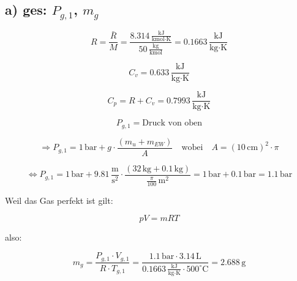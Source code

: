 \subsection*{a) ges: $P_{g,1}$, $m_g$}

\[
R = \frac{\bar{R}}{M} = \frac{8.314 \, \frac{\text{kJ}}{\text{kmol} \cdot \text{K}}}{50 \, \frac{\text{kg}}{\text{kmol}}} = 0.1663 \, \frac{\text{kJ}}{\text{kg} \cdot \text{K}}
\]

\[
C_v = 0.633 \, \frac{\text{kJ}}{\text{kg} \cdot \text{K}}
\]

\[
C_p = R + C_v = 0.7993 \, \frac{\text{kJ}}{\text{kg} \cdot \text{K}}
\]

\[
P_{g,1} = \text{Druck von oben}
\]

\[
\Rightarrow P_{g,1} = 1 \, \text{bar} + g \cdot \frac{(m_u + m_{EW})}{A} \quad \text{wobei} \quad A = (10 \, \text{cm})^2 \cdot \pi
\]

\[
\Leftrightarrow P_{g,1} = 1 \, \text{bar} + 9.81 \, \frac{\text{m}}{\text{s}^2} \cdot \frac{(32 \, \text{kg} + 0.1 \, \text{kg})}{\frac{\pi}{100} \, \text{m}^2} = 1 \, \text{bar} + 0.1 \, \text{bar} = 1.1 \, \text{bar}
\]

Weil das Gas perfekt ist gilt:

\[
pV = mRT
\]

also:

\[
m_g = \frac{P_{g,1} \cdot V_{g,1}}{R \cdot T_{g,1}} = \frac{1.1 \, \text{bar} \cdot 3.14 \, \text{L}}{0.1663 \, \frac{\text{kJ}}{\text{kg} \cdot \text{K}} \cdot 500^\circ \text{C}} = 2.688 \, \text{g}
\]